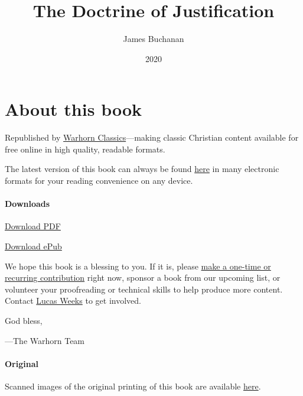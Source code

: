 \documentclass[
]{book}
\title{The Doctrine of Justification}
\author{James Buchanan}
\date{2020}
\begin{document}
\maketitle

\mainmatter
{}

{
\setcounter{tocdepth}{1}
\tableofcontents
}
\hypertarget{about-this-book}{%
\chapter*{About this book}\label{about-this-book}}

Republished by \href{https://classics.warhornmedia.com/}{Warhorn Classics}---making classic Christian content available for free online in high quality, readable formats.

The latest version of this book can always be found \href{https://warhornmedia.github.io/buchanan-doctrine-of-justification/}{here} in many electronic formats for your reading convenience on any device.

\hypertarget{downloads}{%
\subsubsection*{Downloads}\label{downloads}}

\href{https://warhornmedia.github.io/buchanan-doctrine-of-justification//Buchanan-The_Doctrine_of_Justification.pdf}{Download PDF}

\href{https://warhornmedia.github.io/buchanan-doctrine-of-justification//Buchanan-The_Doctrine_of_Justification.epub}{Download ePub}

We hope this book is a blessing to you. If it is, please \href{https://warhornmedia.com/give}{make a one-time or recurring contribution} right now, sponsor a book from our upcoming list, or volunteer your proofreading or technical skills to help produce more content. Contact \href{mailto:lucas@beggarsborn.com}{Lucas Weeks} to get involved.

God bless,

---The Warhorn Team

\hypertarget{original}{%
\subsubsection*{Original}\label{original}}

Scanned images of the original printing of this book are available \href{https://archive.org/details/doctrinejustifi00buchgoog/mode/2up}{here}.
\end{document}
